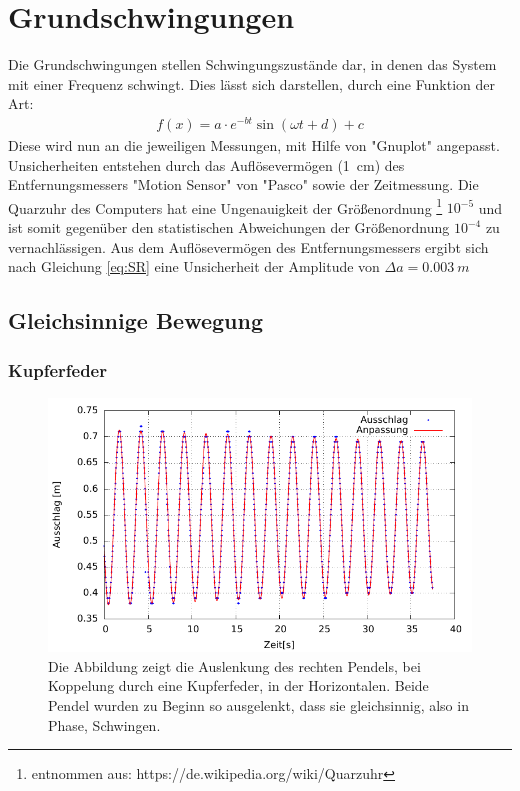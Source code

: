 \section{Grundschwingungen}

Die Grundschwingungen stellen Schwingungszustände dar, in denen das System mit einer Frequenz schwingt. Dies lässt sich darstellen, durch eine Funktion der Art:\\
\begin{align}
f(x)= a \cdot e^{-bt} \sin(\omega t+d)+c
\end{align} 
Diese wird nun an die jeweiligen Messungen, mit Hilfe von "Gnuplot" angepasst. 
Unsicherheiten entstehen durch das Auflösevermögen (\SI{1}{cm}) des Entfernungsmessers "Motion Sensor" von "Pasco" sowie der Zeitmessung. Die Quarzuhr des Computers hat eine Ungenauigkeit der Größenordnung \footnote{entnommen aus: https://de.wikipedia.org/wiki/Quarzuhr} $10^{-5}$ und ist somit gegenüber den statistischen Abweichungen der Größenordnung $10^{-4}$ zu vernachlässigen. Aus dem Auflösevermögen des Entfernungsmessers ergibt sich nach Gleichung \ref{eq:SR} eine Unsicherheit der Amplitude von $\Delta a= \SI{0.003}{m}$
\subsection{Gleichsinnige Bewegung}
\subsubsection*{Kupferfeder}


\begin{figure}[h!]
	\centering
	\includegraphics[width=0.7\linewidth]{Auswertung/kupfer/gleich/kupferglA}
	\caption{Die Abbildung zeigt die Auslenkung des rechten Pendels, bei Koppelung durch eine Kupferfeder, in der Horizontalen. Beide Pendel wurden zu Beginn so ausgelenkt, dass sie gleichsinnig, also in Phase, Schwingen. }
	\label{fig:kupfergl}
\end{figure}

